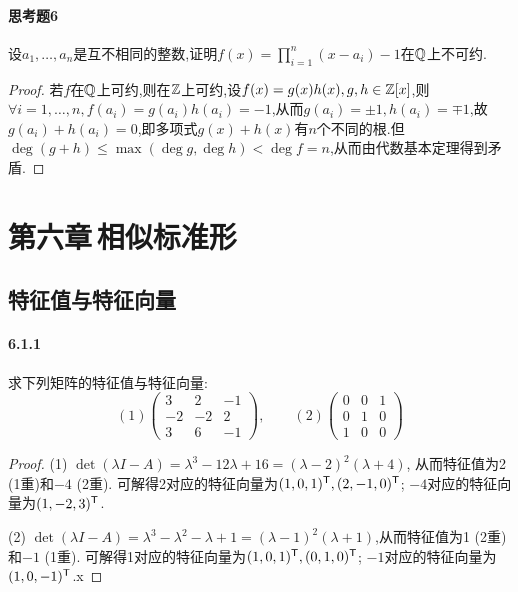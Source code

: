 \documentclass[11pt]{article}
\begin{document}
\paragraph{思考题6}设$a_1,\dots,a_n$是互不相同的整数,证明$f(x)=\prod_{i=1}^{n}(x-a_i)-1$在$\mathbb{Q}$上不可约.
\begin{proof}
    若$f$在$\mathbb{Q}$上可约,则在$\mathbb{Z}$上可约,设$f(x)=g(x)h(x), g,h\in\mathbb{Z}[x]$,则$\forall i=1,\dots,n, f(a_i)=g(a_i)h(a_i)=-1$,从而$g(a_i)=\pm 1, h(a_i)=\mp 1$,故$g(a_i)+h(a_i)=0$,即多项式$g(x)+h(x)$有$n$个不同的根.但$\deg (g+h)\leq \max(\deg g, \deg h)<\deg f=n$,从而由代数基本定理得到矛盾.
\end{proof}


\newpage
\section{第六章\,相似标准形}
\subsection{特征值与特征向量}
\paragraph{6.1.1}求下列矩阵的特征值与特征向量:
$$(1) \begin{pmatrix}
    3&2&-1\\ -2&-2&2\\ 3&6&-1
\end{pmatrix},\qquad (2) \begin{pmatrix}
    0&0&1\\ 0&1&0\\ 1&0&0
\end{pmatrix}$$
\begin{proof}
    (1) $\det(\lambda I-A)=\lambda^3-12 \lambda+16=(\lambda-2)^2 (\lambda+4)$, 从而特征值为2 (1重)和$-4$ (2重). 可解得2对应的特征向量为$(1,0,1)^{\mathsf{T}}, (2,-1,0)^{\mathsf{T}}$; $-4$对应的特征向量为$(1,-2,3)^{\mathsf{T}}$.

    (2) $\det(\lambda I-A)=\lambda^3-\lambda^2-\lambda+1=(\lambda-1)^2 (\lambda+1)$,从而特征值为1 (2重)和$-1$ (1重). 可解得1对应的特征向量为$(1,0,1)^{\mathsf{T}}, (0,1,0)^{\mathsf{T}}$; $-1$对应的特征向量为$(1,0,-1)^{\mathsf{T}}$.x
\end{proof}
\end{document}
